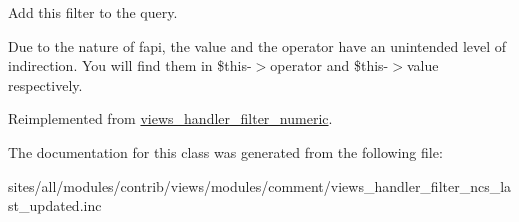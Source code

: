 Add this filter to the query.

Due to the nature of fapi, the value and the operator have an unintended level of indirection. You will find them in \$this-$>$operator and \$this-$>$value respectively. 

Reimplemented from \hyperlink{classviews__handler__filter__numeric_aa5c6b227651bd1676850f5999f2a897}{views\_\-handler\_\-filter\_\-numeric}.

The documentation for this class was generated from the following file:\begin{CompactItemize}
\item 
sites/all/modules/contrib/views/modules/comment/views\_\-handler\_\-filter\_\-ncs\_\-last\_\-updated.inc\end{CompactItemize}
